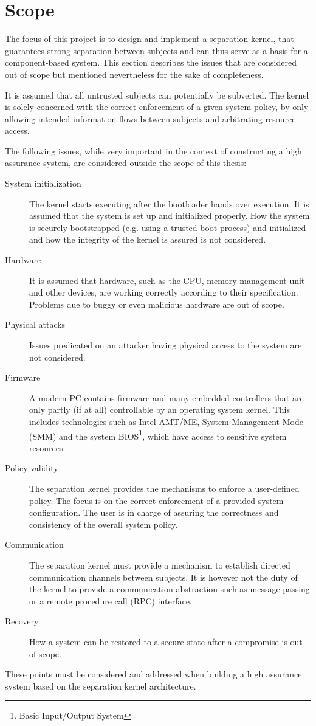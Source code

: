 \section{Scope}
The focus of this project is to design and implement a separation kernel, that
guarantees strong separation between subjects and can thus serve as a basis for
a component-based system. This section describes the issues that are considered
out of scope but mentioned nevertheless for the sake of completeness.

It is assumed that all untrusted subjects can potentially be subverted. The
kernel is solely concerned with the correct enforcement of a given system
policy, by only allowing intended information flows between subjects and
arbitrating resource access.

The following issues, while very important in the context of constructing a
high assurance system, are considered outside the scope of this thesis:

\begin{description}
	\item[System initialization] The kernel starts executing after the
		bootloader hands over execution. It is assumed that the system is set up
		and initialized properly. How the system is securely bootstrapped (e.g.
		using a trusted boot process) and initialized and how the integrity of
		the kernel is assured is not considered.
	\item[Hardware] It is assumed that hardware, such as the CPU, memory
		management unit and other devices, are working correctly according to
		their specification. Problems due to buggy or even malicious hardware
		are out of scope.
	\item[Physical attacks] Issues predicated on an attacker having physical
		access to the system are not considered.
	\item[Firmware] A modern PC contains firmware and many embedded controllers
		that are only partly (if at all) controllable by an operating system
		kernel. This includes technologies such as Intel AMT/ME, System
		Management Mode (SMM) and the system
		BIOS\footnote{Basic Input/Output System}, which have access
		to sensitive system resources.
	\item[Policy validity] The separation kernel provides the mechanisms to
		enforce a user-defined policy. The focus is on the correct enforcement
		of a provided system configuration. The user is in charge of assuring
		the correctness and consistency of the overall system policy.
	\item[Communication] The separation kernel must provide a mechanism to
		establish directed communication channels between subjects.	It is
		however not the duty of the kernel to provide a	communication
		abstraction such as message passing or a remote procedure call (RPC)
		interface.
	\item[Recovery] How a system can be restored to a secure state after a
		compromise is out of scope.
\end{description}

These points must be considered and addressed when building a high assurance
system based on the separation kernel architecture.
